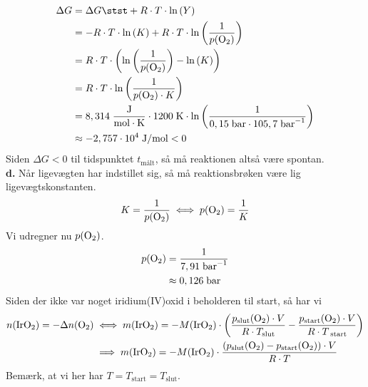 \documentclass{report}
\begin{document}
\begin{equation*}
\begin{split}
  \Delta G &=\Delta G \stst + R \cdot T \cdot \ln\left(Y\right) \\
  &=-R \cdot T \cdot \ln\left(K\right)  + R \cdot T \cdot \ln\left(\frac{1}{p(\ce{O2} )}\right)\\
  &=R \cdot T \cdot \left(\ln\left(\frac{1}{p(\ce{O2} )}\right) - \ln\left(K\right) \right) \\
  &=R \cdot T \cdot \ln\left(\frac{1}{p(\ce{O2} ) \cdot K}\right)\\
  &=8,314 \;\unit{\frac{J}{mol \cdot K}} \cdot 1200 \;\unit{K} \cdot \ln\left(\frac{1}{0,15 \;\unit{bar} \cdot 105,7 \;\unit{bar ^{-1}} }\right) \\
  &\approx -2,757 \cdot 10 ^{4} \;\unit{J/mol} <0
\end{split}
\end{equation*}
Siden $\Delta G<0$ til tidspunktet $t _{\text{målt} }$, så må reaktionen altså være spontan. \\[1ex]
\textbf{d.}
Når ligevægten har indstillet sig, så må reaktionsbrøken være lig ligevægtskonstanten.
\begin{equation*}
\begin{split}
  K=\frac{1}{p(\ce{O2} )} \iff p(\ce{O2} )=\frac{1}{K}
\end{split}
\end{equation*}
Vi udregner nu $p(\ce{O2} )$.
\begin{equation*}
\begin{split}
  p(\ce{O2} )&=\frac{1}{7,91 \;\unit{bar ^{-1}} }\\
  &\approx 0,126 \;\unit{bar} 
\end{split}
\end{equation*}
Siden der ikke var noget iridium(IV)oxid i beholderen til start, så har vi 
\begin{equation*}
\begin{split}
  n(\ce{IrO2} )=-\Delta n(\ce{O2} ) &\iff m(\ce{IrO2} ) = -M(\ce{IrO2} ) \cdot \left(\frac{p_{\text{slut} }(\ce{O2}) \cdot V}{R \cdot T _{\text{slut} }} - \frac{p_{\text{start} }(\ce{O2}) \cdot V}{R \cdot T _{\text{ start}}}\right) \\
  &\implies  m(\ce{IrO2} ) = -M(\ce{IrO2} ) \cdot \frac{(p_{\text{slut} }(\ce{O2})-p_{\text{start}}(\ce{O2} )) \cdot V}{R \cdot T} 
\end{split}
\end{equation*}
Bemærk, at vi her har $T=T _{\text{start} }=T _{\text{slut} }$.
\end{document}
